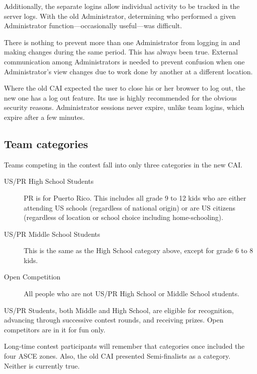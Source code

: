\documentclass[11pt,letterpaper]{refart}
\begin{document}
Additionally, the separate logins allow individual activity to be
tracked in the server logs. With the old Administrator, determining
who performed a given Administrator function---occasionally
useful---was difficult.

There is nothing to prevent more than one Administrator from logging
in and making changes during the same period. This has always been
true. External communication among Administrators is needed to
prevent confusion when one Administrator's view changes due to work
done by another at a different location.

Where the old CAI expected the user to close his or her browser to log
out, the new one has a log out feature. Its use is highly recommended
for the obvious security reasons. Administrator sessions never expire,
unlike team logins, which expire after a few minutes.

\subsection{Team categories}
Teams competing in the contest fall into only three categories in the
new CAI.
\begin{description}
\item[US/PR High School Students] PR is for Puerto Rico. This includes
  all grade 9 to 12 kids who are either attending US schools
  (regardless of national origin) or are US citizens (regardless of
  location or school choice including home-schooling).
\item[US/PR Middle School Students] This is the same as the High
  School category above, except for grade 6 to 8 kids.
\item[Open Competition] All people who are not US/PR High School or
  Middle School students.
\end{description}
US/PR Students, both Middle and High School, are eligible for
recognition, advancing through successive contest rounds, and
receiving prizes. Open competitors are in it for fun only.

Long-time contest participants will remember that categories once
included the four ASCE zones. Also, the old CAI presented
Semi-finalists as a category. Neither is currently true.
\end{document}
